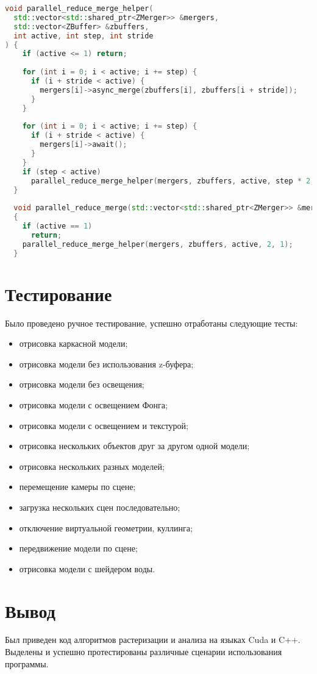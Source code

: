 \begin{lstlisting}[label=lst:z_merge,caption= Алгоритм параллельного редуцирования z-буферов, language=C++]
void parallel_reduce_merge_helper(
  std::vector<std::shared_ptr<ZMerger>> &mergers,
  std::vector<ZBuffer> &zbuffers,
  int active, int step, int stride
) {
    if (active <= 1) return;
  
    for (int i = 0; i < active; i += step) {
      if (i + stride < active) {
        mergers[i]->async_merge(zbuffers[i], zbuffers[i + stride]);
      }
    }
  
    for (int i = 0; i < active; i += step) {
      if (i + stride < active) {
        mergers[i]->await();
      }
    }
    if (step < active)
      parallel_reduce_merge_helper(mergers, zbuffers, active, step * 2, stride * 2);
  }
  
  void parallel_reduce_merge(std::vector<std::shared_ptr<ZMerger>> &mergers, std::vector<ZBuffer> &zbuffers, int active)
  {
    if (active == 1)
      return;
    parallel_reduce_merge_helper(mergers, zbuffers, active, 2, 1);
  }
\end{lstlisting}

\section{Тестирование}

Было проведено ручное тестирование, успешно отработаны следующие тесты:
\begin{itemize}
  \item отрисовка каркасной модели;
  \item отрисовка модели без использования z-буфера;
  \item отрисовка модели без освещения;
  \item отрисовка модели с освещением Фонга;
  \item отрисовка модели с освещением и текстурой;
  \item отрисовка нескольких объектов друг за другом одной модели;
  \item отрисовка нескольких разных моделей;
  \item перемещение камеры по сцене;
  \item загрузка нескольких сцен последовательно;
  \item отключение виртуальной геометрии, куллинга;
  \item передвижение модели по сцене;
  \item отрисовка модели с шейдером воды.
\end{itemize}


\section*{Вывод}

Был приведен код алгоритмов растеризации и анализа на языках Cuda и C++.
Выделены и успешно протестированы различные сценарии использования программы.

